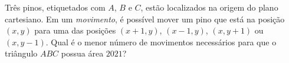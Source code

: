 Três pinos, etiquetados com \(A\), \(B\) e \(C\), estão localizados na origem do plano cartesiano.
Em um \textit{movimento}, é possível mover um pino que está na posição \((x, y)\) para uma das posições \((x + 1, y)\), \((x-1, y)\), \((x, y+1)\) ou \((x, y-1)\).
Qual é o menor número de movimentos necessários para que o triângulo \(ABC\) possua área \(2021\)?
